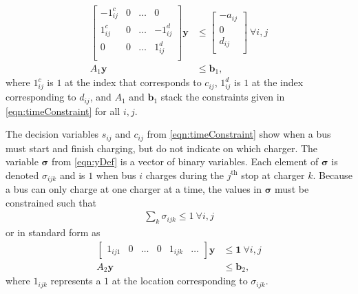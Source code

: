 \begin{equation} \begin{aligned}
	\begin{bmatrix}
		-1^c_{ij} & 0 & \hdots &  0        \\
	         1^c_{ij} & 0 & \hdots & -1^d_{ij} \\
		 0        & 0 & \hdots &  1^d_{ij} \\ 
	\end{bmatrix}
	\mathbf{y} &\le 
	\begin{bmatrix}
	        -a_{ij} \\ 
		 0      \\ 
		 d_{ij} \\
	\end{bmatrix} \ \forall i,j \\
	A_1\mathbf{y} &\le \mathbf{b}_1,
\end{aligned} \end{equation}
	where $1^{c}_{ij}$ is $1$ at the index that corresponds to $c_{ij}$, $1^d_{ij}$ is $1$ at the index corresponding to $d_{ij}$, and $A_1$ and $\mathbf{b}_1$ stack the constraints given in \eqref{eqn:timeConstraint} for all $i,j$.
	\par The decision variables $s_{ij}$ and $c_{ij}$ from \eqref{eqn:timeConstraint} show when a bus must start and finish charging, but do not indicate on which charger. The variable $\boldsymbol{\sigma}$ from \eqref{eqn:yDef} is a vector of binary variables. Each element of $\boldsymbol{\sigma}$ is denoted $\sigma_{ijk}$ and is $1$ when bus $i$ charges during the $j^{\text{th}}$ stop at charger $k$. Because a bus can only charge at one charger at a time, the values in $\boldsymbol{\sigma}$ must be constrained such that
\begin{equation}
	\begin{aligned}
		\sum_k \sigma_{ijk} \le 1 \ \forall i,j
	\end{aligned}
\end{equation} 
or in standard form as 
\begin{equation} \begin{aligned}
	\begin{bmatrix}1_{ij1} & 0 & \hdots & 0 & 1_{ijk} & \hdots \end{bmatrix} \mathbf{y} &\le \mathbf{1} \ \forall i,j\\
		A_2\mathbf{y} & \le \mathbf{b}_2,
\end{aligned} \end{equation}
where $1_{ijk}$ represents a $1$ at the location corresponding to $\sigma_{ijk}$.
